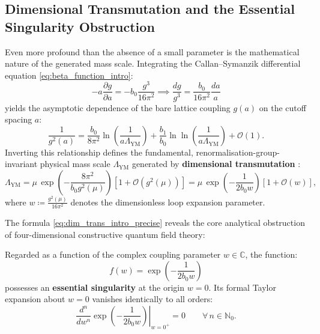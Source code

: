 \subsection{Dimensional Transmutation and the Essential Singularity Obstruction}
\label{subsec:dimensional_transmutation_intro}
Even more profound than the absence of a small parameter is the mathematical nature of the generated mass scale. Integrating the Callan--Symanzik differential equation \eqref{eq:beta_function_intro}:
\begin{equation}
-a \frac{\partial g}{\partial a} = -b_0 \frac{g^3}{16\pi^2} \implies \frac{dg}{g^3} = \frac{b_0}{16\pi^2} \frac{da}{a}
\end{equation}
yields the asymptotic dependence of the bare lattice coupling $g(a)$ on the cutoff spacing $a$:
\begin{equation}
\label{eq:running_coupling_ch1}
\frac{1}{g^2(a)} = \frac{b_0}{8\pi^2} \ln\left( \frac{1}{a \Lambda_{\mathrm{YM}}} \right) + \frac{b_1}{b_0} \ln\ln\left( \frac{1}{a \Lambda_{\mathrm{YM}}} \right) + \mathcal{O}(1).
\end{equation}
Inverting this relationship defines the fundamental, renormalisation-group-invariant physical mass scale $\Lambda_{\mathrm{YM}}$ generated by \textbf{dimensional transmutation} \cite{ColemanWeinberg1973}:
\begin{equation}
\label{eq:dim_trans_intro_precise}
\boxed{
\Lambda_{\mathrm{YM}} = \mu \, \exp\left( -\frac{8\pi^2}{b_0 g^2(\mu)} \right) \left[ 1 + \mathcal{O}(g^2(\mu)) \right] = \mu \, \exp\left( -\frac{1}{2 b_0 w} \right) \left[ 1 + \mathcal{O}(w) \right],
}
\end{equation}
where $w \coloneqq \frac{g^2(\mu)}{16\pi^2}$ denotes the dimensionless loop expansion parameter.

The formula \eqref{eq:dim_trans_intro_precise} reveals the core analytical obstruction of four-dimensional constructive quantum field theory:
\begin{proposition}
\label{prop:non_analyticity_intro}
Regarded as a function of the complex coupling parameter $w \in \mathbb{C}$, the function:
\begin{equation}
f(w) = \exp\left( -\frac{1}{2 b_0 w} \right)
\end{equation}
possesses an \textbf{essential singularity} at the origin $w = 0$. Its formal Taylor expansion about $w = 0$ vanishes identically to all orders:
\begin{equation}
\label{eq:taylor_vanishing}
\left. \frac{d^n}{dw^n} \exp\left( -\frac{1}{2 b_0 w} \right) \right|_{w=0^+} = 0 \qquad \forall \, n \in \mathbb{N}_0.
\end{equation}
\end{proposition}

